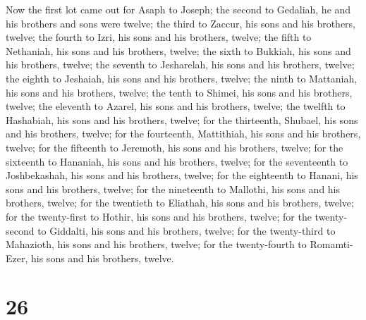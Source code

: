  Now the first lot came out for Asaph to Joseph; the
second to Gedaliah, he and his brothers and sons were twelve;
 the third to Zaccur, his sons and his brothers, twelve;
 the fourth to Izri, his sons and his brothers, twelve;
 the fifth to Nethaniah, his sons and his brothers,
twelve;  the sixth to Bukkiah, his sons and his brothers,
twelve;  the seventh to Jesharelah, his sons and his
brothers, twelve;  the eighth to Jeshaiah, his sons and
his brothers, twelve;  the ninth to Mattaniah, his sons
and his brothers, twelve;  the tenth to Shimei, his sons
and his brothers, twelve;  the eleventh to Azarel, his
sons and his brothers, twelve;  the twelfth to Hashabiah,
his sons and his brothers, twelve;  for the thirteenth,
Shubael, his sons and his brothers, twelve;  for the
fourteenth, Mattithiah, his sons and his brothers, twelve;
 for the fifteenth to Jeremoth, his sons and his
brothers, twelve;  for the sixteenth to Hananiah, his
sons and his brothers, twelve;  for the seventeenth to
Joshbekashah, his sons and his brothers, twelve;  for the
eighteenth to Hanani, his sons and his brothers, twelve; 
for the nineteenth to Mallothi, his sons and his brothers, twelve;
 for the twentieth to Eliathah, his sons and his
brothers, twelve;  for the twenty-first to Hothir, his
sons and his brothers, twelve;  for the twenty-second to
Giddalti, his sons and his brothers, twelve;  for the
twenty-third to Mahazioth, his sons and his brothers, twelve;
 for the twenty-fourth to Romamti-Ezer, his sons and his
brothers, twelve.

\hypertarget{section-25}{%
\section{26}\label{section-25}}

